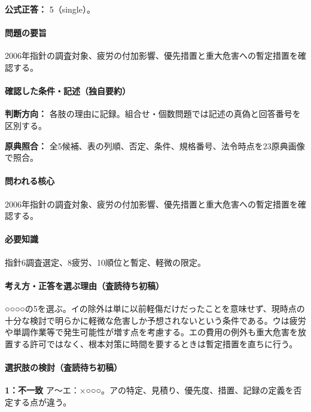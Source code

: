\textbf{公式正答：} 5（single）。

\paragraph{問題の要旨} 2006年指針の調査対象、疲労の付加影響、優先措置と重大危害への暫定措置を確認する。

\paragraph{確認した条件・記述（独自要約）}\mbox{}\par

\noindent\textbf{判断方向：} 各肢の理由に記録。組合せ・個数問題では記述の真偽と回答番号を区別する。\par

\noindent\textbf{原典照合：} 全5候補、表の列順、否定、条件、規格番号、法令時点を23原典画像で照合。\par

\paragraph{問われる核心} 2006年指針の調査対象、疲労の付加影響、優先措置と重大危害への暫定措置を確認する。

\paragraph{必要知識} 指針6調査選定、8疲労、10順位と暫定、軽微の限定。

\paragraph{考え方・正答を選ぶ理由（査読待ち初稿）} ○○○○の5を選ぶ。イの除外は単に以前軽傷だけだったことを意味せず、現時点の十分な検討で明らかに軽微な危害しか予想されないという条件である。ウは疲労や単調作業等で発生可能性が増す点を考慮する。エの費用の例外も重大危害を放置する許可ではなく、根本対策に時間を要するときは暫定措置を直ちに行う。

\paragraph{選択肢の検討（査読待ち初稿）}\mbox{}\par

\noindent\textbf{1：不一致} ア〜エ：×○○○。アの特定、見積り、優先度、措置、記録の定義を否定する点が違う。\par

